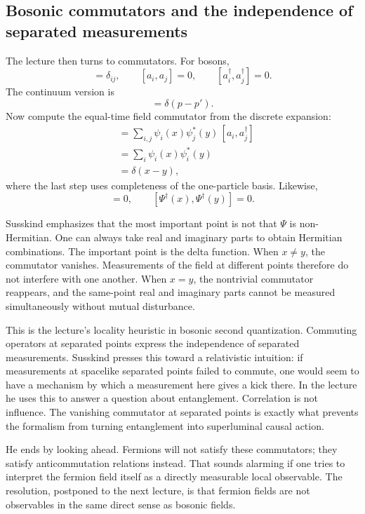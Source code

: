 \subsection{Bosonic commutators and the independence of separated measurements}

The lecture then turns to commutators. For bosons,
\begin{equation}
[a_i,a_j^\dagger]=\delta_{ij},
\qquad
[a_i,a_j]=0,
\qquad
[a_i^\dagger,a_j^\dagger]=0.
\end{equation}
The continuum version is
\begin{equation}
[a(p),a^\dagger(p')]=\delta(p-p').
\end{equation}
Now compute the equal-time field commutator from the discrete expansion:
\begin{align}
[\Psi(x),\Psi^\dagger(y)]
&= \sum_{i,j}\psi_i(x)\psi_j^*(y)\,[a_i,a_j^\dagger] \\
&= \sum_i \psi_i(x)\psi_i^*(y) \\
&= \delta(x-y),
\end{align}
where the last step uses completeness of the one-particle basis. Likewise,
\begin{equation}
[\Psi(x),\Psi(y)]=0,
\qquad
[\Psi^\dagger(x),\Psi^\dagger(y)]=0.
\end{equation}

Susskind emphasizes that the most important point is not that \(\Psi\) is non-Hermitian. One can always take real and imaginary parts to obtain Hermitian combinations. The important point is the delta function. When \(x\neq y\), the commutator vanishes. Measurements of the field at different points therefore do not interfere with one another. When \(x=y\), the nontrivial commutator reappears, and the same-point real and imaginary parts cannot be measured simultaneously without mutual disturbance.

This is the lecture's locality heuristic in bosonic second quantization. Commuting operators at separated points express the independence of separated measurements. Susskind presses this toward a relativistic intuition: if measurements at spacelike separated points failed to commute, one would seem to have a mechanism by which a measurement here gives a kick there. In the lecture he uses this to answer a question about entanglement. Correlation is not influence. The vanishing commutator at separated points is exactly what prevents the formalism from turning entanglement into superluminal causal action.

He ends by looking ahead. Fermions will not satisfy these commutators; they satisfy anticommutation relations instead. That sounds alarming if one tries to interpret the fermion field itself as a directly measurable local observable. The resolution, postponed to the next lecture, is that fermion fields are not observables in the same direct sense as bosonic fields.

